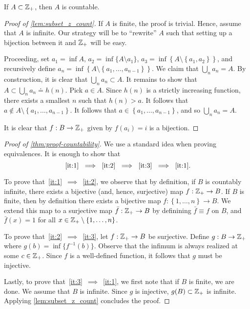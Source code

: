 \begin{lemma}\label{lem:subset_z_count}
	If $A \subset \mathbb{Z}_{+}$, then $A$ is countable.
\end{lemma}
\begin{proof}[Proof of \cref{lem:subset_z_count}]
	If $A$ is finite, the proof is trivial. Hence, assume that $A$ is infinite.
	Our strategy will be to ``rewrite'' $A$ such that setting up a bijection
	between it and $\mathbb{Z}_{+}$ will be easy.

	Proceeding, set $a_1 = \inf A$, $a_{2} = \inf \{A \setminus {a_{1}}\}$,
	$a_{3} = \inf \left\{ A \setminus \left\{ a_{1}, a_{2} \right\} \right\}$,
	and recursively define $a_{n} = \inf \left\{ A \setminus \left\{
			a_{1}, \dots,
	a_{n-1} \right\}\right\}$. We claim that $\bigcup_{n} a_{n} = A$. By
	construction, it is clear that $\bigcup_{n} a_{n} \subset A$. It remains to show
	that $A \subset \bigcup_{n} a_{n} \doteq h(n)$. Pick $a \in A$. Since
	$h(n)$ is a strictly increasing function, there exists a smallest $n$ such that
	$h(n) > a$. It follows that
	$a \not \in A \setminus\left\{ a_{1}, \dots, a_{n-1} \right\}$. It follows that
	$a \in \left\{ a_{1}, \dots, a_{n-1} \right\}$, and so
	$\bigcup_{n} a_{n} = A$. 

	It is clear that $f: B \to
	\mathbb{Z}_{+}$ given by $f(a_{i}) = i$ is a bijection.

\end{proof}

\begin{proof}[Proof of \cref{thm:proof-countability}]
	We use a standard idea when proving equivalences. It is enough to show that
	\[~\eqref{it:1}~\implies~\eqref{it:2}~\implies~\eqref{it:3}~\implies~\eqref{it:1}.\]

	To prove that~\eqref{it:1}~$\implies$~\eqref{it:2}, we observe that by
	definition, if $B$ is countably infinite, there exists a bijective
	(and, hence, surjective) map  $f: \mathbb{Z}_{+} \to B$. 
	If $B$ is finite, then by definition there exists a bijective map
	$f: \left\{ 1, \dots, n \right\} \to B$. We extend this map to a surjective
	map $\bar{f}: \mathbb{Z}_{+} \to B$ by definining $\bar{f} \equiv f$ on $B$,
	and $\bar{f}(x) = 1$ for all $x \in \mathbb{Z}_{+} \setminus \left\{ 1, \dots, n
	\right\}$.

	To prove that~\eqref{it:2}~$\implies$~\eqref{it:3}, let
	$f:\mathbb{Z}_{+} \to B$ be surjective. Define $g: B \to \mathbb{Z}_{+}$
	where $g(b) = \inf \{f^{-1}(b) \}$. Observe that the infimum is always
	realized at some $c \in \mathbb{Z}_{+}$. Since $f$ is a well-defined
	function, it follows that $g$ must be injective.

	Lastly, to prove that~\eqref{it:3}~$\implies$~\eqref{it:1}, we first note that
	if $B$ is finite, we are done. We assume that $B$ is infinite. Since $g$ is
	injective, $g(B) \subset \mathbb{Z}_{+}$ is infinite. Applying
	\cref{lem:subset_z_count} concludes the proof.

\end{proof}

